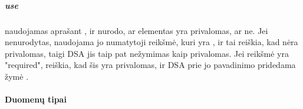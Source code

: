 \documentclass[letterpaper,10pt,lithuanian]{sphinxmanual}
\begin{document}
\subparagraph{use}
\label{\detokenize{schemos/xsd:use}}\label{\detokenize{schemos/xsd:xsd-use}}
\sphinxAtStartPar
{} naudojamas aprašant {\hyperref[\detokenize{schemos/xsd:xsd-attribute}]{}}, ir nurodo, ar elementas yra privalomas,
ar ne. Jei  nenurodytas, naudojama jo numatytoji reikšmė, kuri yra ,
ir tai reiškia, kad {\hyperref[\detokenize{schemos/xsd:xsd-attribute}]{}} nėra privalomas, taigi DSA jis taip pat nežymimas
kaip privalomas. Jei  reikšmė yra "required", reiškia, kad šis {\hyperref[\detokenize{schemos/xsd:xsd-attribute}]{}} yra
privalomas, ir DSA prie jo pavadinimo pridedama žymė .


\paragraph{Duomenų tipai}
\label{\detokenize{schemos/xsd:duomenu-tipai}}
\end{document}
